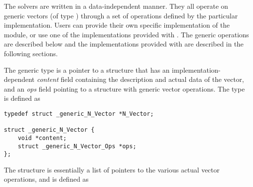 %
The {\sundials} solvers are written in a data-independent manner. 
They all operate on generic vectors (of type ) through a set of
operations defined by the particular {\nvector} implementation.
Users can provide their own specific implementation of the {\nvector}
module, or use one of the implementations provided with {\sundials}.
The generic operations are described below and the implementations
provided with {\sundials} are described in the following sections.

The generic  type is a pointer to a structure that has an 
implementation-dependent {\em content} field containing the 
description and actual data of the vector, and an {\em ops} field 
pointing to a structure with generic vector operations.
The type  is defined as
\begin{verbatim}
typedef struct _generic_N_Vector *N_Vector;

struct _generic_N_Vector {
    void *content;
    struct _generic_N_Vector_Ops *ops;
};
\end{verbatim}
The  structure is essentially a list of pointers to
the various actual vector operations, and is defined as
